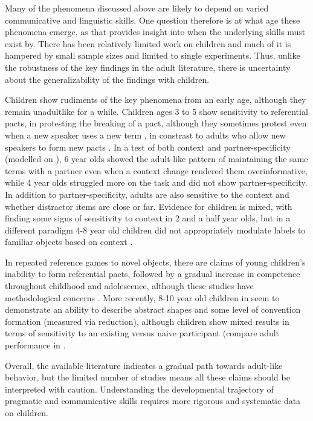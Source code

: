\documentclass[]{article}
\begin{document}
Many of the phenomena discussed above are likely to depend on varied communicative and linguistic skills. One question therefore is at what age these phenomena emerge, as that provides insight into when the underlying skills must exist by. There has been relatively limited work on children and much of it is hampered by small sample sizes and limited to single experiments. Thus, unlike the robustness of the key findings in the adult literature, there is uncertainty about the generalizability of the findings with children. 

Children show rudiments of the key phenomena from an early age, although they remain unadultlike for a while. Children ages 3 to 5 show sensitivity to referential pacts, in protesting the breaking of a pact, although they sometimes protest even when a new speaker uses a new term \cite{matthewsWhatMannerSpeaking2010}, in constrast to adults who allow new speakers to form new pacts \citet{metzing2003a}. In a test of both context and partner-specificity (modelled on \citet{brennan1996}), 6 year olds showed the adult-like pattern of maintaining the same terms with a partner even when a context change rendered them overinformative, while 4 year olds struggled more on the task and did not show partner-specificity.  	In addition to partner-specificity, adults are also sensitive to the context and whether distractor items are close or far. Evidence for children is mixed, with \citet{abbot-smith2016} finding some signs of sensitivity to context in 2 and a half year olds, but in a different paradigm 4-8 year old children did not appropriately modulate labels to familiar objects based on context \citep{leung2023}.

In repeated reference games to novel objects, there are claims of young children's inability to form referential pacts, followed by a gradual increase in competence throughout childhood and adolescence, although these studies have methodological concerns \cite{glucksberg1967, glucksberg1966}. More recently, 8-10 year old children in \citet{branigan2016} seem to demonstrate an ability to describe abstract shapes and some level of convention formation (measured via reduction), although children show mixed results in terms of sensitivity to an existing versus naive participant (compare adult performance in \citet{wilkes-gibbs1992}. 
	
Overall, the available literature indicates a gradual path towards adult-like behavior, but the limited number of studies means all these claims should be interpreted with caution. Understanding the developmental trajectory of pragmatic and communicative skills requires more rigorous and systematic data on children. 
 
\end{document}
